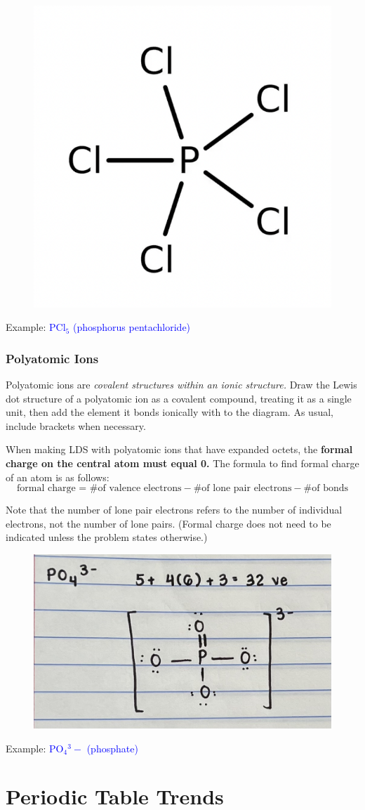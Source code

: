 \documentclass[a4paper, 12pt]{article}
\begin{document}
\begin{figure}[ht]
    \centering
    \includegraphics[width=0.2\linewidth]{exceptionlds.png}
    \label{fig:4}
\end{figure}

\noindent Example: \textcolor{blue}{PCl$_5$ (phosphorus pentachloride)}

\subsubsection*{Polyatomic Ions}
Polyatomic ions are \textit{covalent structures within an ionic structure.} Draw the Lewis dot structure of a polyatomic ion as a covalent compound, treating it as a single unit, then add the element it bonds ionically with to the diagram. As usual, include brackets when necessary.
 
When making LDS with polyatomic ions that have expanded octets, the \textbf{formal charge on the central atom must equal 0.} The formula to find formal charge of an atom is as follows: 
 $$ \text{formal charge = \# of valence electrons} - \text{\# of lone pair electrons} - \text{\# of bonds} $$

\noindent Note that the number of lone pair electrons refers to the number of individual electrons, not the number of lone pairs. (Formal charge does not need to be indicated unless the problem states otherwise.)

\begin{figure}[ht]
    \centering
    \includegraphics[width=0.5\linewidth]{expandedlds.jpeg}
    \label{fig:enter-label}
\end{figure}
\noindent Example: \textcolor{blue}{PO$_4$$^3-$ (phosphate)}

\section{Periodic Table Trends}
\end{document}

